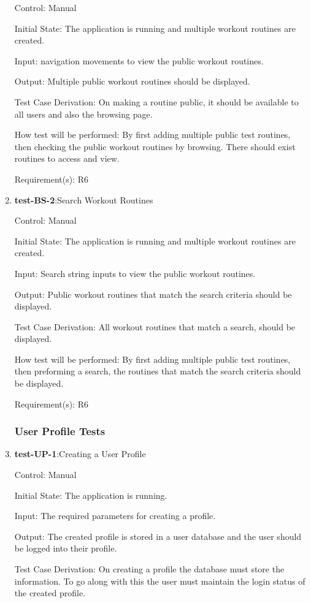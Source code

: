 \documentclass[12pt, titlepage]{article}
\begin{document}
\begin{enumerate}
		Control: Manual
		
		Initial State: The application is running and multiple workout routines are created.
		
		Input: navigation movements to view the public workout routines.
		
		Output: Multiple public workout routines should be displayed. 
		
		Test Case Derivation: On making a routine public, it should be available to all users and also the browsing page.
		
		How test will be performed: By first adding multiple public test routines, then checking the public workout routines by browsing. There should exist routines to access and view.
		
		Requirement(s): R6
		
		\item{\textbf{test-BS-2}}:Search Workout Routines
		
		Control: Manual
		
		Initial State: The application is running and multiple workout routines are created.
		
		Input: Search string inputs to view the public workout routines.
		
		Output: Public workout routines that match the search criteria should be displayed. 
		
		Test Case Derivation: All workout routines that match a search, should be displayed.
		
		How test will be performed: By first adding multiple public test routines, then preforming a search, the routines that match the search criteria should be displayed.
		
		Requirement(s): R6
		
		\subsubsection{User Profile Tests}
		\item{\textbf{test-UP-1}}:Creating a User Profile
		
		Control: Manual
		
		Initial State: The application is running.
		
		Input: The required parameters for creating a profile.
		
		Output: The created profile is stored in a user database and the user should be logged into their profile.
		
		Test Case Derivation: On creating a profile the database must store the information. To go along with this the user must maintain the login status of the created profile.
		

\end{enumerate}
\end{document}
